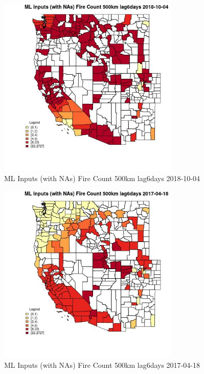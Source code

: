 \begin{figure} 
\centering  
\includegraphics[width=0.77\textwidth]{Code_Outputs/Report_ML_input_PM25_Step4_part_f_de_duplicated_aves_prioritize_24hr_obswNAs_CountyFire_Count_500km_lag6daysMean2018-10-04.jpg} 
\caption{\label{fig:Report_ML_input_PM25_Step4_part_f_de_duplicated_aves_prioritize_24hr_obswNAsCountyFire_Count_500km_lag6daysMean2018-10-04}ML Inputs (with NAs) Fire Count 500km lag6days 2018-10-04} 
\end{figure} 
 

\begin{figure} 
\centering  
\includegraphics[width=0.77\textwidth]{Code_Outputs/Report_ML_input_PM25_Step4_part_f_de_duplicated_aves_prioritize_24hr_obswNAs_CountyFire_Count_500km_lag6daysMean2017-04-18.jpg} 
\caption{\label{fig:Report_ML_input_PM25_Step4_part_f_de_duplicated_aves_prioritize_24hr_obswNAsCountyFire_Count_500km_lag6daysMean2017-04-18}ML Inputs (with NAs) Fire Count 500km lag6days 2017-04-18} 
\end{figure} 
 

